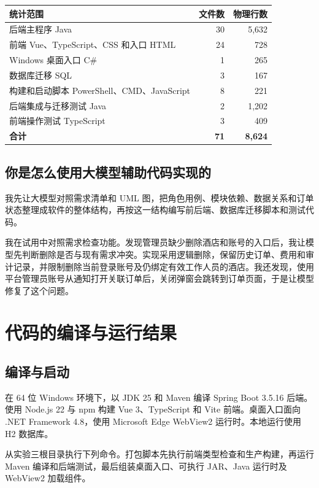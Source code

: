 \documentclass[UTF8,zihao=-4,fontset=windows]{ctexart}
\begin{document}
\vspace{3mm}
{\small
\noindent\begin{tabularx}{\linewidth}{@{}Yrr@{}}
\toprule
\textbf{统计范围} & \textbf{文件数} & \textbf{物理行数} \\
\midrule
后端主程序 Java & 30 & 5,632 \\
前端 Vue、TypeScript、CSS 和入口 HTML & 24 & 728 \\
Windows 桌面入口 C\# & 1 & 265 \\
数据库迁移 SQL & 3 & 167 \\
构建和启动脚本 PowerShell、CMD、JavaScript & 8 & 221 \\
后端集成与迁移测试 Java & 2 & 1,202 \\
前端操作测试 TypeScript & 3 & 409 \\
\midrule
\textbf{合计} & \textbf{71} & \textbf{8,624} \\
\bottomrule
\end{tabularx}\par
}

\subsection{你是怎么使用大模型辅助代码实现的}

我先让大模型对照需求清单和 UML 图，把角色用例、模块依赖、数据关系和订单状态整理成软件的整体结构，再按这一结构编写前后端、数据库迁移脚本和测试代码。

我在试用中对照需求检查功能。发现管理员缺少删除酒店和账号的入口后，我让模型先判断删除是否与现有需求冲突。实现采用逻辑删除，保留历史订单、费用和审计记录，并限制删除当前登录账号及仍绑定有效工作人员的酒店。我还发现，使用平台管理员账号从通知打开关联订单后，关闭弹窗会跳转到订单页面，于是让模型修复了这个问题。

\clearpage

\section{代码的编译与运行结果}
\subsection{编译与启动}

在 64 位 Windows 环境下，以 JDK 25 和 Maven 编译 Spring Boot 3.5.16 后端。使用 Node.js 22 与 npm 构建 Vue 3、TypeScript 和 Vite 前端。桌面入口面向 .NET Framework 4.8，使用 Microsoft Edge WebView2 运行时。本地运行使用 H2 数据库。

从实验三根目录执行下列命令。打包脚本先执行前端类型检查和生产构建，再运行 Maven 编译和后端测试，最后组装桌面入口、可执行 JAR、Java 运行时及 WebView2 加载组件。
\end{document}
